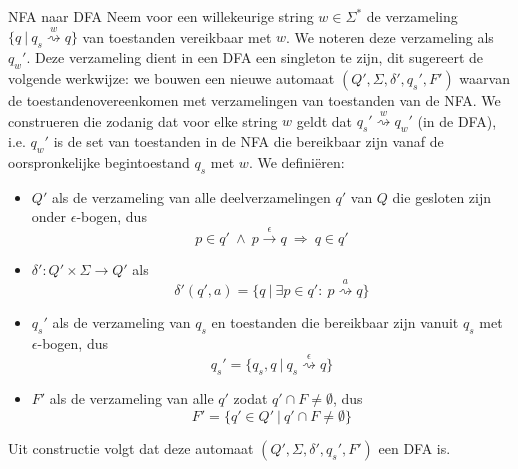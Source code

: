 \begin{alg}{NFA naar DFA}
    \vspace{-0.2cm}
    Neem voor een willekeurige string $w \in \Sigma^*$ de verzameling $\{ q \ | \ q_s \overset{w}{\rightsquigarrow} q\}$ van toestanden vereikbaar met $w$. We noteren deze verzameling als $q_w'$. Deze verzameling dient in een DFA een singleton te zijn, dit sugereert de volgende werkwijze: we bouwen een nieuwe automaat $(Q', \Sigma,\delta',q_s',F')$ waarvan de toestandenovereenkomen met verzamelingen van toestanden van de NFA\@. We construeren die zodanig dat voor elke string $w$ geldt dat $q_s' \overset{w}{\rightsquigarrow} q_w'$ (in de DFA), i\@.e\@. $q_w'$ is de set van toestanden in de NFA die bereikbaar zijn vanaf de oorspronkelijke begintoestand $q_s$ met $w$.  We definiëren:
    \begin{itemize}
        \item 
            $Q'$ als de verzameling van alle deelverzamelingen $q'$ van $Q$ die gesloten zijn onder $\epsilon$-bogen, dus
            \begin{equation*}
                p \in q' \ \land \ p \overset{\epsilon}{\longrightarrow} q \ \Rightarrow \ q \in q'
            \end{equation*}
        \item 
            $\delta': Q' \times \Sigma \rightarrow Q'$ als 
                \begin{equation*}
                    \delta'(q',a) = \{q \ | \ \exists p \in q': \ p \overset{a}{\rightsquigarrow} q \}
                \end{equation*}
        \item 
            $q_s'$ als de verzameling van $q_s$ en toestanden die bereikbaar zijn vanuit $q_s$ met $\epsilon$-bogen, dus
            \begin{equation*}
                q_s' = \{q_s,q \ | \ q_s \overset{\epsilon}{\rightsquigarrow} q \}
            \end{equation*}
        \item 
            $F'$ als de verzameling van alle $q'$ zodat $q' \cap F \neq \emptyset$, dus
            \begin{equation*}
                F' = \{q' \in Q' \ | \ q' \cap F \neq \emptyset \}
            \end{equation*}
    \end{itemize}
    Uit constructie volgt dat deze automaat $(Q', \Sigma,\delta',q_s',F')$ een DFA is.
\end{alg}

